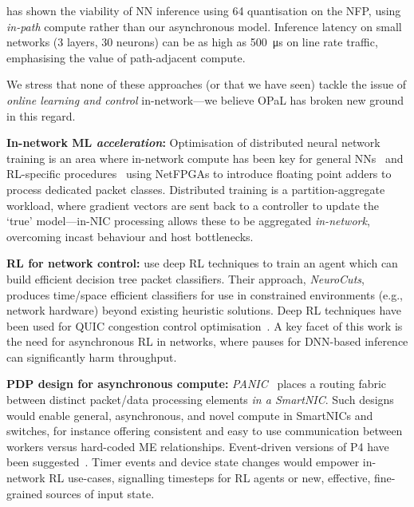 \documentclass[
sigconf,natbib=false
,anonymous=true
,10pt
]{acmart}
\newcommand{\fakepara}[1]{\noindent\textbf{#1:}}
\newcommand{\approachshort}{OPaL}
\begin{document}
\textcite{langlet-ml-netronome} has shown the viability of NN inference using \SI{64}{\bit} quantisation on the NFP, using \emph{in-path} compute rather than our asynchronous model.
Inference latency on small networks (3 layers, \num{30} neurons) can be as high as \SI{500}{\micro\second} on line rate traffic, emphasising the value of path-adjacent compute.

We stress that none of these approaches (or that we have seen) tackle the issue of \emph{online learning and control} in-network---we believe \approachshort{} has broken new ground in this regard.

\fakepara{In-network ML \emph{acceleration}}
Optimisation of distributed neural network training is an area where in-network compute has been key for general NNs~\parencite{DBLP:conf/micro/LiPAYQPWSEK18} and RL-specific procedures~\parencite{DBLP:conf/isca/LiLYCSH19} using NetFPGAs to introduce floating point adders to process dedicated packet classes.
Distributed training is a partition-aggregate workload, where gradient vectors are sent back to a controller to update the `true' model---in-NIC processing allows these to be aggregated \emph{in-network}, overcoming incast behaviour and host bottlenecks.

\fakepara{RL for network control}
\Textcite{DBLP:conf/sigcomm/LiangZJS19} use deep RL techniques to train an agent which can build efficient decision tree packet classifiers.
Their approach, \emph{NeuroCuts}, produces time/space efficient classifiers for use in constrained environments (e.g., network hardware) beyond existing heuristic solutions.
Deep RL techniques have been used for QUIC congestion control optimisation~\parencite{DBLP:journals/corr/abs-1910-04054}.
A key facet of this work is the need for asynchronous RL in networks, where pauses for DNN-based inference can significantly harm throughput.

\fakepara{PDP design for asynchronous compute}
\emph{PANIC}~\parencite{DBLP:conf/hotnets/StephensAS18} places a routing fabric between distinct packet/data processing elements \emph{in a SmartNIC}.
Such designs would enable general, asynchronous, and novel compute in SmartNICs and switches, for instance offering consistent and easy to use communication between workers versus hard-coded ME relationships.
Event-driven versions of P4 have been suggested~\parencite{DBLP:conf/hotnets/IbanezABM19}.
Timer events and device state changes would empower in-network RL use-cases, signalling timesteps for RL agents or new, effective, fine-grained sources of input state.
\end{document}
